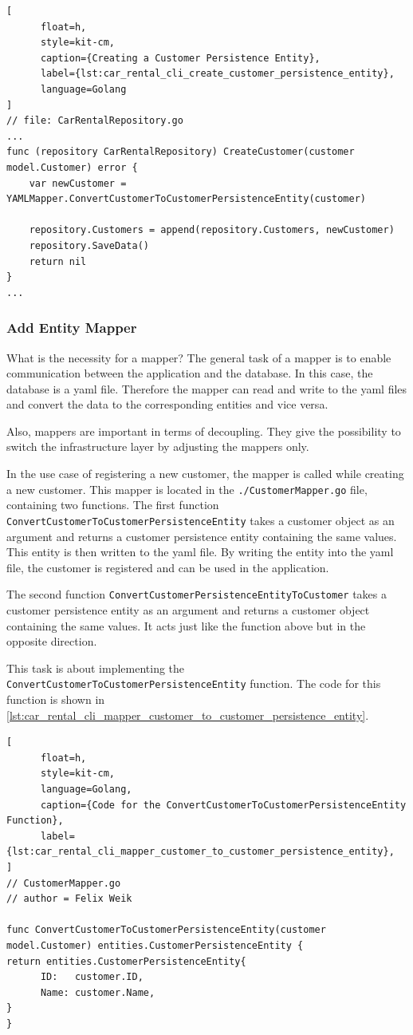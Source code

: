 \begin{lstlisting}[
      float=h,
      style=kit-cm,
      caption={Creating a Customer Persistence Entity},
      label={lst:car_rental_cli_create_customer_persistence_entity},
      language=Golang
]
// file: CarRentalRepository.go
...
func (repository CarRentalRepository) CreateCustomer(customer model.Customer) error {
	var newCustomer = YAMLMapper.ConvertCustomerToCustomerPersistenceEntity(customer)

	repository.Customers = append(repository.Customers, newCustomer)
	repository.SaveData()
	return nil
}
...
\end{lstlisting}

\subsubsection*{Add Entity Mapper}
What is the necessity for a mapper?
The general task of a mapper is to enable communication between the application and the database.
In this case, the database is a yaml file.
Therefore the mapper can read and write to the yaml files and convert the data to the corresponding entities and vice versa.

Also, mappers are important in terms of decoupling.
They give the possibility to switch the infrastructure layer by adjusting the mappers only.

In the use case of registering a new customer, the mapper is called while creating a new customer.
This mapper is located in the \texttt{./CustomerMapper.go} file, containing two functions.
The first function \texttt{ConvertCustomerToCustomerPersistenceEntity} takes a customer object as an argument and returns a customer persistence entity containing the same values.
This entity is then written to the yaml file.
By writing the entity into the yaml file, the customer is registered and can be used in the application.

The second function \texttt{ConvertCustomerPersistenceEntityToCustomer} takes a customer persistence entity as an argument and returns a customer object containing the same values.
It acts just like the function above but in the opposite direction.

This task is about implementing the \texttt{ConvertCustomerToCustomerPersistenceEntity} function.
The code for this function is shown in \autoref{lst:car_rental_cli_mapper_customer_to_customer_persistence_entity}.

\begin{lstlisting}[
      float=h,
      style=kit-cm,
      language=Golang,
      caption={Code for the ConvertCustomerToCustomerPersistenceEntity Function},
      label={lst:car_rental_cli_mapper_customer_to_customer_persistence_entity},
]
// CustomerMapper.go
// author = Felix Weik

func ConvertCustomerToCustomerPersistenceEntity(customer model.Customer) entities.CustomerPersistenceEntity {
return entities.CustomerPersistenceEntity{
      ID:   customer.ID,
      Name: customer.Name,
}
}
\end{lstlisting}

